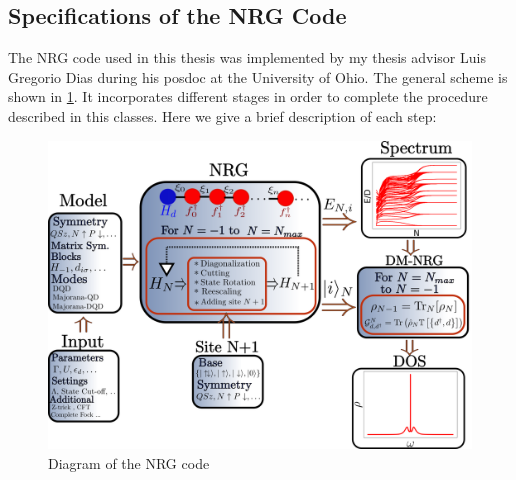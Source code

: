 





\subsection{Specifications of the NRG Code }

The NRG code used in this thesis was implemented by my thesis advisor Luis Gregorio Dias during his posdoc at the University of Ohio.  The general scheme  is shown in \ref{fig:Code}. It incorporates different stages in order to complete the procedure described in this classes. Here we give a brief description of each step:

\begin{figure}[t]
\centering
\includegraphics[scale=0.4]{IMAGES/NRG/NRGcode.png}
\caption{\label{fig:Code} Diagram of the NRG code}
\end{figure}

